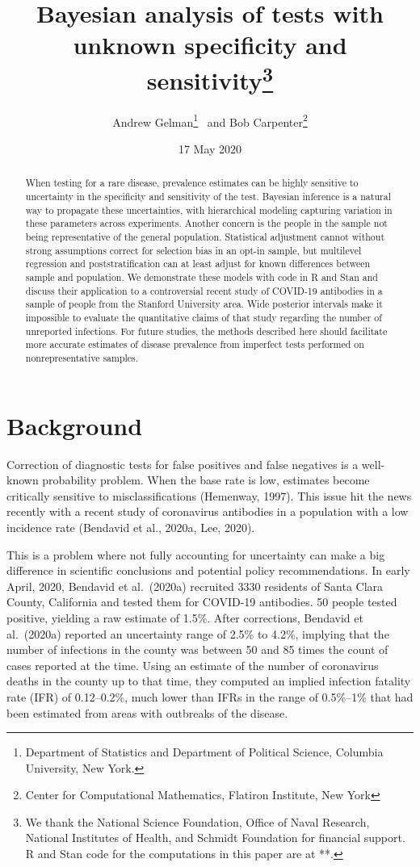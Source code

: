 \documentclass[11pt]{article}
\title{\bf Bayesian analysis of tests with unknown specificity and sensitivity\footnote{We thank the National Science Foundation, Office of Naval Research, National Institutes of Health, and Schmidt Foundation for financial support.  R and Stan code for the computations in this paper are at **.}\vspace{.1in}}
\author{Andrew Gelman\footnote{Department of Statistics and Department of 
Political Science, Columbia University, New York.}  \ and Bob Carpenter\footnote{Center for Computational Mathematics, Flatiron Institute, New York}
\vspace{.1in}}
\date{17 May 2020}
\begin{document}
\sloppy
\maketitle

\begin{abstract}
When testing for a rare disease, prevalence estimates can be highly sensitive to uncertainty in the specificity and sensitivity of the test.  Bayesian inference is a natural way to propagate these uncertainties, with hierarchical modeling capturing variation in these parameters across experiments.  Another concern is the people in the sample not being representative of the general population.  Statistical adjustment cannot without strong assumptions correct for selection bias in an opt-in sample, but multilevel regression and poststratification can at least adjust for known differences between sample and population.  We demonstrate these models with code in R and Stan and discuss their application to a controversial recent study of COVID-19 antibodies in a sample of people from the Stanford University area.  Wide posterior intervals make it impossible to evaluate the quantitative claims of that study regarding the number of unreported infections.  For future studies, the methods described here should facilitate more accurate estimates of disease prevalence from imperfect tests performed on nonrepresentative samples. 
\end{abstract}

\section{Background}

Correction of diagnostic tests for false positives and false negatives is a well-known probability problem.  When the base rate is low, estimates become critically sensitive to misclassifications (Hemenway, 1997).  This issue hit the news recently with a recent study of coronavirus antibodies in a population with a low incidence rate (Bendavid et al., 2020a, Lee, 2020).

This is a problem where not fully accounting for uncertainty can make a big difference in scientific conclusions and potential policy recommendations.  In early April, 2020, Bendavid et al.\ (2020a) recruited 3330 residents of Santa Clara County, California and tested them for COVID-19 antibodies.  50 people tested positive, yielding a raw estimate of 1.5\%.  After corrections, Bendavid et al.\ (2020a) reported an uncertainty range of 2.5\% to 4.2\%, implying that the number of infections in the county was between 50 and 85 times the count of cases reported at the time.  Using an estimate of the number of coronavirus deaths in the county up to that time, they computed an implied infection fatality rate (IFR) of 0.12--0.2\%, much lower than IFRs in the range of 0.5\%--1\% that had been estimated from areas with outbreaks of the disease.
\end{document}
